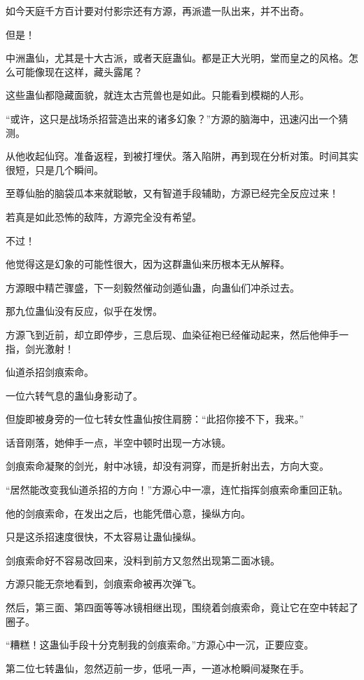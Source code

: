 \begin{this_body}
如今天庭千方百计要对付影宗还有方源，再派遣一队出来，并不出奇。

但是！

中洲蛊仙，尤其是十大古派，或者天庭蛊仙。都是正大光明，堂而皇之的风格。怎么可能像现在这样，藏头露尾？

这些蛊仙都隐藏面貌，就连太古荒兽也是如此。只能看到模糊的人形。

“或许，这只是战场杀招营造出来的诸多幻象？”方源的脑海中，迅速闪出一个猜测。

从他收起仙窍。准备返程，到被打埋伏。落入陷阱，再到现在分析对策。时间其实很短，只是几个瞬间。

至尊仙胎的脑袋瓜本来就聪敏，又有智道手段辅助，方源已经完全反应过来！

若真是如此恐怖的敌阵，方源完全没有希望。

不过！

他觉得这是幻象的可能性很大，因为这群蛊仙来历根本无从解释。

方源眼中精芒骤盛，下一刻毅然催动剑遁仙蛊，向蛊仙们冲杀过去。

那九位蛊仙没有反应，似乎在发愣。

方源飞到近前，却立即停步，三息后现、血染征袍已经催动起来，然后他伸手一指，剑光激射！

仙道杀招剑痕索命。

一位六转气息的蛊仙身影动了。

但旋即被身旁的一位七转女性蛊仙按住肩膀：“此招你接不下，我来。”

话音刚落，她伸手一点，半空中顿时出现一方冰镜。

剑痕索命凝聚的剑光，射中冰镜，却没有洞穿，而是折射出去，方向大变。

“居然能改变我仙道杀招的方向！”方源心中一凛，连忙指挥剑痕索命重回正轨。

他的剑痕索命，在发出之后，也能凭借心意，操纵方向。

只是这杀招速度很快，不太容易让蛊仙操纵。

剑痕索命好不容易改回来，没料到前方又忽然出现第二面冰镜。

方源只能无奈地看到，剑痕索命被再次弹飞。

然后，第三面、第四面等等冰镜相继出现，围绕着剑痕索命，竟让它在空中转起了圈子。

“糟糕！这蛊仙手段十分克制我的剑痕索命。”方源心中一沉，正要应变。

第二位七转蛊仙，忽然迈前一步，低吼一声，一道冰枪瞬间凝聚在手。


\end{this_body}
